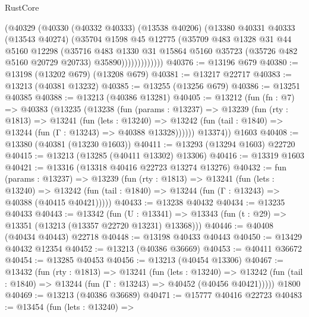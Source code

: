 \begin{lexlean}{RustCore}
\begin{coremodule}
                  (@40329
                    (@40330
                      (@40332 @40333)
                      (@13538 @40206)
                      (@13380
                        @40331
                        @40333
                        (@13543 @40274)
                        (@35704
                          @1598
                          @45
                          @12775
                          (@35709
                            @483
                            @1328
                            @31
                            @44
                            @5160
                            @12298
                            (@35716
                              @483
                              @1330
                              @31
                              @15864
                              @5160
                              @35723
                              (@35726 @482 @5160 @20729 @20733)
                              @35890)))))))))))))
@40376 := @13196 @679
@40380 := @13198 (@13202 @679) (@13208 @679)
@40381 := @13217 @22717
@40383 := @13213 (@40381 @13232)
@40385 := @13255 (@13256 @679)
@40386 := @13251 @40385
@40388 := @13213 (@40386 @13281)
@40405 := @13212
    (fun (fn : @7) =>
    @40383
      (@13235
        (@13238
          (fun (params : @13237) =>
          @13239
            (fun (rty : @1813) =>
            @13241
              (fun (lets : @13240) =>
              @13242 (fun (tail : @1840) => @13244 (fun (Γ : @13243) => @40388 @13328))))))
        @13374))
    @1603
@40408 := @13380 (@40381 (@13230 @1603))
@40411 := @13293 (@13294 @1603) @22720
@40415 := @13213 (@13285 (@40411 @13302) @13306)
@40416 := @13319 @1603
@40421 := @13316 (@13318 @40416 @22723 @13274 @13276)
@40432 := fun (params : @13237) =>
  @13239
    (fun (rty : @1813) =>
    @13241
      (fun (lets : @13240) =>
      @13242 (fun (tail : @1840) => @13244 (fun (Γ : @13243) => @40388 (@40415 @40421)))))
@40433 := @13238 @40432
@40434 := @13235 @40433
@40443 := @13342
    (fun (U : @13341) => @13343 (fun (t : @29) => @13351 (@13213 (@13357 @22720 @13231) @13368)))
@40446 := @40408 (@40434 @40443) @22718
@40448 := @13198 @40433 @40443
@40450 := @13429 @40432 @12354
@40452 := @13213 (@40386 @36669)
@40453 := @40411 @36672
@40454 := @13285 @40453
@40456 := @13213 (@40454 @13306)
@40467 := @13432
    (fun (rty : @1813) =>
    @13241
      (fun (lets : @13240) =>
      @13242 (fun (tail : @1840) => @13244 (fun (Γ : @13243) => @40452 (@40456 @40421)))))
    @1800
@40469 := @13213 (@40386 @36689)
@40471 := @15777 @40416 @22723
@40483 := @13454
    (fun (lets : @13240) =>

\end{coremodule}
\end{lexlean}
